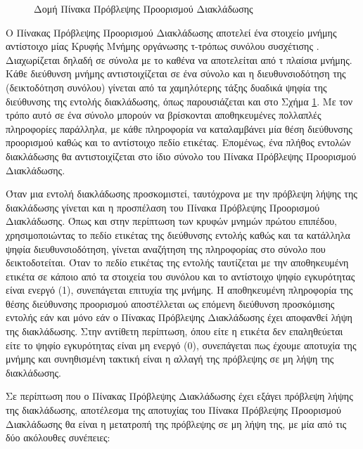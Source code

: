 \begin{figure}[!b]
    \centering
    \caption{Δομή Πίνακα Πρόβλεψης Προορισμού Διακλάδωσης}
    \label{fig:chap2_branch_target_buffer}
\end{figure}

\par
Ο Πίνακας Πρόβλεψης Προορισμού Διακλάδωσης αποτελεί ένα στοιχείο μνήμης αντίστοιχο μίας Κρυφής Μνήμης οργάνωσης τ-τρόπως συνόλου συσχέτισης \cite{nikolos2012architecture}. Διαχωρίζεται δηλαδή σε σύνολα με το καθένα να αποτελείται από τ πλαίσια μνήμης. Κάθε διεύθυνση μνήμης αντιστοιχίζεται σε ένα σύνολο και η διευθυνσιοδότηση της (δεικτοδότηση συνόλου) γίνεται από τα χαμηλότερης τάξης δυαδικά ψηφία της διεύθυνσης της εντολής διακλάδωσης, όπως παρουσιάζεται και στο Σχήμα \ref{fig:chap2_branch_target_buffer}. Με τον τρόπο αυτό σε ένα σύνολο μπορούν να βρίσκονται αποθηκευμένες πολλαπλές πληροφορίες παράλληλα, με κάθε πληροφορία να καταλαμβάνει μία θέση διεύθυνσης προορισμού καθώς και το αντίστοιχο πεδίο ετικέτας. Επομένως, ένα πλήθος εντολών διακλάδωσης θα αντιστοιχίζεται στο ίδιο σύνολο του Πίνακα Πρόβλεψης Προορισμού Διακλάδωσης.
\par
Όταν μια εντολή διακλάδωσης προσκομιστεί, ταυτόχρονα με την πρόβλεψη λήψης της διακλάδωσης γίνεται και η προσπέλαση του Πίνακα Πρόβλεψης Προορισμού Διακλάδωσης. Όπως και στην περίπτωση των κρυφών μνημών πρώτου επιπέδου, χρησιμοποιώντας το πεδίο ετικέτας της διεύθυνσης εντολής καθώς και τα κατάλληλα ψηφία διευθυνσιοδότηση, γίνεται αναζήτηση της πληροφορίας στο σύνολο που δεικτοδοτείται. Όταν το πεδίο ετικέτας της εντολής ταυτίζεται με την αποθηκευμένη ετικέτα σε κάποιο από τα στοιχεία του συνόλου και το αντίστοιχο ψηφίο εγκυρότητας είναι ενεργό (1), συνεπάγεται επιτυχία της μνήμης. Η αποθηκευμένη πληροφορία της θέσης διεύθυνσης προορισμού αποστέλλεται ως επόμενη διεύθυνση προσκόμισης εντολής εάν και μόνο εάν ο Πίνακας Πρόβλεψης Διακλάδωσης έχει αποφανθεί λήψη της διακλάδωσης. Στην αντίθετη περίπτωση, όπου είτε η ετικέτα δεν επαληθεύεται είτε το ψηφίο εγκυρότητας είναι μη ενεργό (0), συνεπάγεται πως έχουμε αποτυχία της μνήμης και συνηθισμένη τακτική είναι η αλλαγή της πρόβλεψης σε μη λήψη της διακλάδωσης.
\par
Σε περίπτωση που ο Πίνακας Πρόβλεψης Διακλάδωσης έχει εξάγει πρόβλεψη λήψης της διακλάδωσης, αποτέλεσμα της αποτυχίας του Πίνακα Πρόβλεψης Προορισμού Διακλάδωσης θα είναι η μετατροπή της πρόβλεψης σε μη λήψη της, με μία από τις δύο ακόλουθες συνέπειες:\\
